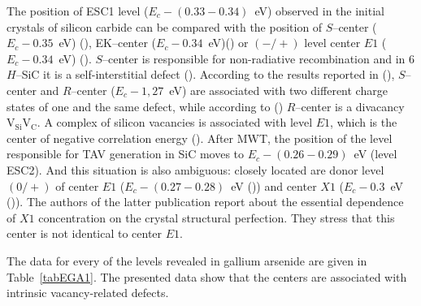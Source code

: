 \documentclass[final,3p,times,twocolumn,authoryear]{elsarticle}
\begin{document}

%





The position of ESC1 level ($E_c-(0.33-0.34)$~eV) observed in the initial crystals of silicon carbide can be compared
with the position of $S$--center ($E_c-0.35$~eV) (\cite{Lebed1999En,Anikin1991:2En,Anikin1991:3En}),
EK–center ($E_c-0.34$~eV)(\cite{Kuznets1997En})
or $(-/+)$ level center $E1$ ($E_c-0.34$~eV) (\cite{Lebed1999En}).
$S$--center is responsible for non-radiative recombination and
in 6$H$–SiC it is a self-interstitial defect (\cite{Lebed1999En}).
According to the results reported in (\cite{Anikin1991:2En,Anikin1991:3En}),
$S$--center and $R$--center ($E_c-1,27$~eV) are associated with two different charge states
of one and the same defect,
while according to (\cite{Lebedev2000En})
$R$--center is a divacancy $\mathrm{V}_\mathrm{Si}\mathrm{V}_\mathrm{C}$.
A complex of silicon vacancies is associated with level $E1$, which is the center of negative correlation energy (\cite{Lebedev2001En}).
After MWT, the position of the level responsible for TAV generation in SiC moves
to $E_c-(0.26-0.29)$~eV (level ESC2).
And this situation is also ambiguous: closely located are donor level $(0/+)$ of
center $E1$ ($E_c-(0.27-0.28)$~eV (\cite{Hemmingsson}))
and center $X1$ ($E_c-0.3$~eV (\cite{Lebedev2001En})).
The authors of the latter publication report about the essential dependence of $X1$ concentration on the crystal structural perfection.
They stress that this center is not identical to center $E1$.












The data for every of the levels revealed in gallium arsenide are given in Table~\ref{tabEGA1}.
The presented data show that the centers are associated with intrinsic vacancy-related defects.
\end{document}
